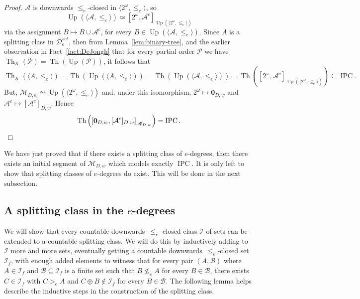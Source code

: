 \documentclass[11pt]{amsart}
\DeclareMathOperator{\up}{Up}
\newcommand{\Th}{\operatorname{Th}}
\newcommand{\IPC}{\operatorname{IPC}}
\begin{document}
\begin{proof}
$\mathcal{A}$ is downwards $\leq_e$-closed in  $\langle 2^\omega, 
\leq_e\rangle$, so 
\[
\up\left(\langle \mathcal{A}, \leq_e \rangle\right) \simeq  
\left[2^\omega, \mathcal{A}^c\right]_{\up(\langle 
2^\omega, \leq_e\rangle)}
\]
via the assignment $B \mapsto B \cup \mathcal{A}^c$, for every $B \in \up(\langle 
\mathcal{A}, \leq_e \rangle)$. Since $A$ is a splitting class in
$\mathscr{D}_e^{set}$, then from Lemma~\ref{lem:binary-tree}, and the 
earlier observation in Fact~\ref{fact:DeJongh} that for every partial order 
$\mathscr{P}$ we have $\Th_K(\mathscr{P})=\Th(\up(\mathscr{P}))$, it follows 
that  
\[
\Th_K\left(\langle A, \leq_e \rangle\right)= \Th\left(\up(\langle A, 
\leq_e\rangle)\right)
= \Th\left(\up(\langle \mathcal{A}, \leq_e\rangle)\right)
= \Th\left(\left[2^\omega, \mathcal{A}^c\right]_{\up(\langle 2^\omega, 
\leq_e\rangle)}\right) \subseteq \IPC.
\]
But, $\mathscr{M}_{D,w} \simeq \up(\langle 2^\omega, \leq_e\rangle)$ and, 
under this isomorphism, $2^\omega \mapsto \mathbf{0}_{D,w}$ and 
$\mathcal{A}^c \mapsto [\mathcal{A}^c]_{D,w}$. Hence 
\[
\Th\left(\left[\mathbf{0}_{D,w}, [\mathcal{A}^c]_{D,w}\right]_{\mathscr{M}_{D,w}}
\right)=\IPC.  
\qedhere
\]
\end{proof}

We have just proved that if there exists a splitting class of $e$-degrees, 
then there exists an initial segment of $\mathscr{M}_{D,w}$ which models 
exactly $\IPC$. It is only left to show that splitting classes of $e$-degrees 
do exist. This will be done in the next subsection. 
 
\subsection{A splitting class in the $e$-degrees}

We will show that every countable downwards~$\leq_e$-closed class 
$\mathcal{I}$ of sets can be extended to a countable splitting class. We will 
do this by inductively adding to $\mathcal{I}$ more and more sets, eventually 
getting a countable downwards~$\leq_e$-closed set $\mathcal{I}_f$, with 
enough added elements to witness that for every pair $(A, \mathcal{B})$ where 
$A\in \mathcal{I}_f$ and $\mathcal{B} \subseteq \mathcal{I}_f$ is a finite 
set such that $B \nleq_e A$ for every $B \in \mathcal{B}$, there exists $C 
\in \mathcal{I}_f$ with $C>_e A$ and $C \oplus B \notin \mathcal{I}_f$ for 
every $B \in \mathcal{B}$. The following lemma helps describe the inductive 
steps in the construction of the splitting class. 
\end{document}
